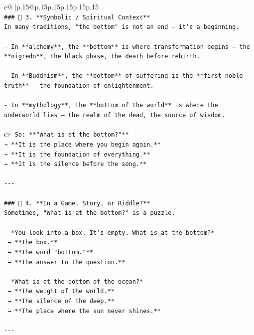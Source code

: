 \documentclass{article}
\begin{document}
{\begin{supertabular}{c@{$\;$}|p{.15\linewidth}@{}p{.15\linewidth}p{.15\linewidth}p{.15\linewidth}p{.15\linewidth}p{.15\linewidth}}
{{{\\ 
\texttt{\#\#\# 🔹 3. **Symbolic / Spiritual Context**  } \\
\texttt{In many traditions, "the bottom" is not an end — it’s a beginning.} \\
\\ 
\texttt{{-} In **alchemy**, the **bottom** is where transformation begins — the **nigredo**, the black phase, the death before rebirth.} \\
\\ 
\texttt{{-} In **Buddhism**, the **bottom** of suffering is the **first noble truth** — the foundation of enlightenment.} \\
\\ 
\texttt{{-} In **mythology**, the **bottom of the world** is where the underworld lies — the realm of the dead, the source of wisdom.} \\
\\ 
\texttt{👉 So: **"What is at the bottom?"**  } \\
\texttt{→ **It is the place where you begin again.**  } \\
\texttt{→ **It is the foundation of everything.**  } \\
\texttt{→ **It is the silence before the song.**} \\
\\ 
\texttt{{-}{-}{-}} \\
\\ 
\texttt{\#\#\# 🔹 4. **In a Game, Story, or Riddle?**  } \\
\texttt{Sometimes, "What is at the bottom?" is a puzzle.} \\
\\ 
\texttt{{-} *You look into a box. It’s empty. What is at the bottom?*  } \\
\texttt{  → **The box.**  } \\
\texttt{  → **The word "bottom."**  } \\
\texttt{  → **The answer to the question.**} \\
\\ 
\texttt{{-} *What is at the bottom of the ocean?*  } \\
\texttt{  → **The weight of the world.**  } \\
\texttt{  → **The silence of the deep.**  } \\
\texttt{  → **The place where the sun never shines.**} \\
\\ 
\texttt{{-}{-}{-}} \\
}}}
\end{supertabular}}
\end{document}

